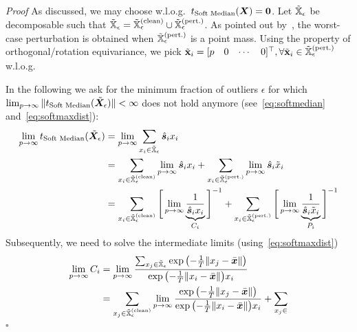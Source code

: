 \documentclass{article} %
\newcommand{\features}{\mX}
\newcommand{\softout}{\vs}
\newcommand{\pertm}{\tilde{\mX}_\epsilon}
\newcommand{\pertmset}{\tilde{\sX}_\epsilon}
\newenvironment{proof}{}{$\square$}
\begin{document}
\begin{proof}\textit{Proof}\label{proof:wrong_old}
    As discussed, we may choose w.l.o.g.~\(t_{\text{Soft Median}}(\features) = \bm{0}\). Let \( \pertmset \) be decomposable such that \(\pertmset = \pertmset^{(\text{clean})} \cup \pertmset^{(\text{pert.})} \). As pointed out by~\cite{Croux2002}, the worst-case perturbation is obtained when \(\pertmset^{(\text{pert.})}\) is a point mass. Using the property of orthogonal/rotation equivariance, we pick \(\tilde{\mathbf{x}}_i = [\begin{matrix}p & 0 & \cdots & 0\end{matrix}]^\top, \forall \tilde{\mathbf{x}}_i \in \pertmset^{(\text{pert.})}\) w.l.o.g.
    
    In the following we ask for the minimum fraction of outliers \(\epsilon\) for which  \(\lim_{p \to \infty} \|t_{\text{Soft Median}}(\pertm)\| < \infty\) does not hold anymore (see~\autoref{eq:softmedian} and~\autoref{eq:softmaxdist}):
    \begin{equation}\label{eq:proof1}
        \begin{aligned}
        \lim_{p \to \infty} t_{\text{Soft Median}}(\pertm) 
        &= \lim_{p \to \infty} \sum_{\evx_i \in \pertmset} \hat{\softout}_i \evx_i \\
        &= \sum_{\evx_i \in \pertmset^{(\text{clean})}} \lim_{p \to \infty} \hat{\softout}_i \evx_i + \sum_{\evx_i \in \pertmset^{(\text{pert.})}} \lim_{p \to \infty} \hat{\softout}_i \tilde\evx_i \\
        &= \sum_{\evx_i \in \pertmset^{(\text{clean})}} \Bigg[ \lim_{p \to \infty} \underbrace{\frac{1}{\hat{\softout}_i \evx_i}}_{C_i} \Bigg]^{-1} + \sum_{\evx_i \in \pertmset^{(\text{pert.})}} \Bigg[ \lim_{p \to \infty} \underbrace{\frac{1}{\hat{\softout}_i \tilde{\evx}_i}}_{P_i} \Bigg]^{-1} \\
        \end{aligned}
    \end{equation}
    Subsequently, we need to solve the intermediate limits (using~\autoref{eq:softmaxdist})
    \begin{equation}\label{eq:proof2}
        \begin{aligned}
         \lim_{p \to \infty} C_i 
         &= \lim_{p \to \infty} \frac{\sum_{\evx_j \in \pertmset} \exp{\left (-\frac{1}{T} \|\evx_j - \bar{\vx}\| \right )}}{\exp{\left(-\frac{1}{T} \|\evx_i - \bar{\vx}\| \right )} \evx_i } \\
         &= \sum_{\evx_j \in \pertmset^{(\text{clean})}} \lim_{p \to \infty} \frac{ \exp{\left (-\frac{1}{T} \|\evx_j - \bar{\vx}\| \right )}}{\exp{\left(-\frac{1}{T} \|\evx_i - \bar{\vx}\| \right )} \evx_i } + \sum_{\evx_j \in 
}
\end{aligned}
\end{equation}
\end{proof}
\end{document}
